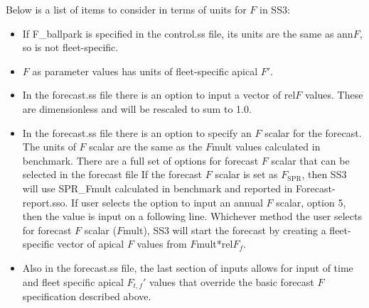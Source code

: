 Below is a list of items to consider in terms of units for $F$ in SS3:
\begin{itemize}
	\item If F\_ballpark is specified in the control.ss file, its units are the same as ann$F$, so is not fleet-specific.
	
	\item $F$ as parameter values has units of fleet-specific apical $F'$.
	
	\item In the forecast.ss file there is an option to input a vector of rel$F$ values. These are dimensionless and will be rescaled to sum to 1.0.
	
	\item In the forecast.ss file there is an option to specify an $F$ scalar for the forecast.  The units of $F$ scalar are the same as the $F$mult values calculated in benchmark.  There are a full set of options for forecast $F$ scalar that can be selected in the forecast file 
	If the forecast $F$ scalar is set as $F_\text{SPR}$, then SS3 will use SPR\_Fmult calculated in benchmark and reported in Forecast-report.sso.  If user selects the option to input an annual $F$ scalar, option 5, then the value is input on a following line.  Whichever method the user selects for forecast $F$ scalar ($F$mult), SS3 will start the forecast by creating a fleet-specific vector of apical $F$ values from $F$mult*rel$F_f$.
	
	\item Also in the forecast.ss file, the last section of inputs allows for input of time and fleet specific apical $F_{t,f}'$ values that override the basic forecast $F$ specification described above.
\end{itemize}
